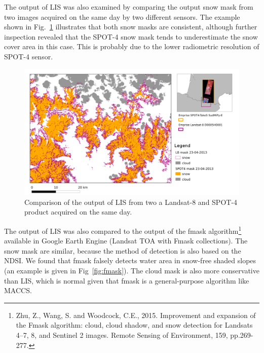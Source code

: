 \documentclass[a4paper]{article}
\begin{document}
The output of LIS was also examined by comparing the output snow mask from two images acquired on the same day by two different sensors. The example shown in Fig.~\ref{fig:L8vsS4-23042013} illustrates that both snow masks are consistent, although further inspection revealed that the SPOT-4 snow mask tends to underestimate the snow cover area in this case. This is probably due to the lower radiometric resolution of SPOT-4 sensor.

\begin{figure}[h]
 \centering
 \includegraphics[width=\textwidth]{./images/L8vsS4-23042013_montage.png}
 \caption{Comparison of the output of LIS from two a Landsat-8 and SPOT-4 product acquired on the same day.}
 \label{fig:L8vsS4-23042013}
\end{figure}

The output of LIS was also compared to the output of the fmask algorithm\footnote{Zhu, Z., Wang, S. and Woodcock, C.E., 2015. Improvement and expansion of the Fmask algorithm: cloud, cloud shadow, and snow detection for Landsats 4–7, 8, and Sentinel 2 images. Remote Sensing of Environment, 159, pp.269-277.} available in Google Earth Engine (Landsat TOA with Fmask collections). The snow mask are similar, because the method of detection is also based on the NDSI. We found that fmask falsely detects water area in snow-free shaded slopes (an example is given in Fig~\ref{fig:fmask}). The cloud mask is also more conservative than LIS, which is normal given that fmask is a general-purpose algorithm like MACCS. 
\end{document}
